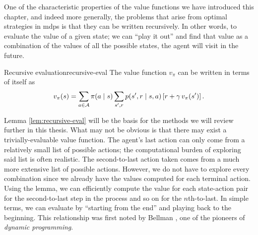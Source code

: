 One of the characteristic properties of the value functions we have introduced
this chapter, and indeed more generally, the problems that arise from optimal
strategies in \ac{mdp}s is that they can be written recursively. In other words, to
evaluate the value of a given state; we can ``play it out'' and find that value
as a combination of the values of all the possible states, the agent will visit in
the future.

\begin{lemma}{Recursive evaluation}{recursive-eval}
	The value function $v_\pi$ can be written in terms of itself as
	\[
		v_\pi (s) = \sum_{a \in \mathcal{A}} \pi(a \mid s) \sum_{s', r} p(s', r \mid s, a) \left[ r + \gamma \, v_\pi (s') \right].
	\]
\end{lemma}

Lemma \ref{lem:recursive-eval} will be the basis for the methods we will review
further in this thesis. What may not be obvious is that there may exist a
trivially-evaluable value function. The agent's last action can only come from a
relatively small list of possible actions; the computational burden of exploring
said list is often realistic. The second-to-last action taken comes from a much
more extensive list of possible actions. However, we do not have to explore
every combination since we already have the values computed for each terminal
action.  Using the lemma, we can efficiently compute the value for each
state-action pair for the second-to-last step in the process and so on for the
$n$th-to-last. In simple terms, we can evaluate by ``starting from the end'' and
playing back to the beginning. This relationship was first noted by Bellman
\cite{bellman1957}, one of the pioneers of \textit{dynamic programming}.

